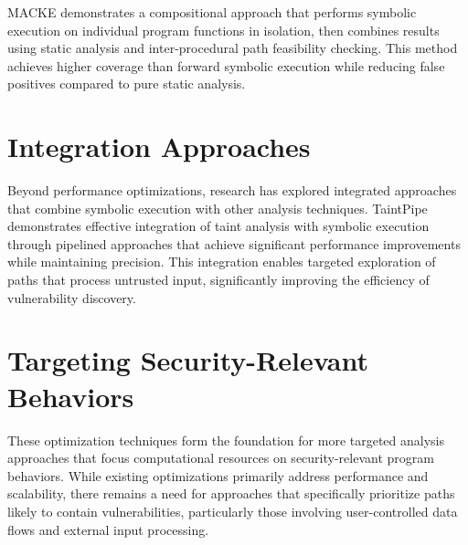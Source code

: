 MACKE \cite{ognawala_macke_2016} demonstrates a compositional approach that performs symbolic execution on individual program functions in isolation, then combines results using static analysis and inter-procedural path feasibility checking. This method achieves higher coverage than forward symbolic execution while reducing false positives compared to pure static analysis.

\section{Integration Approaches}

Beyond performance optimizations, research has explored integrated approaches that combine symbolic execution with other analysis techniques. TaintPipe \cite{ming_taintpipe_2015} demonstrates effective integration of taint analysis with symbolic execution through pipelined approaches that achieve significant performance improvements while maintaining precision. This integration enables targeted exploration of paths that process untrusted input, significantly improving the efficiency of vulnerability discovery.

\section{Targeting Security-Relevant Behaviors}

These optimization techniques form the foundation for more targeted analysis approaches that focus computational resources on security-relevant program behaviors. While existing optimizations primarily address performance and scalability, there remains a need for approaches that specifically prioritize paths likely to contain vulnerabilities, particularly those involving user-controlled data flows and external input processing.
